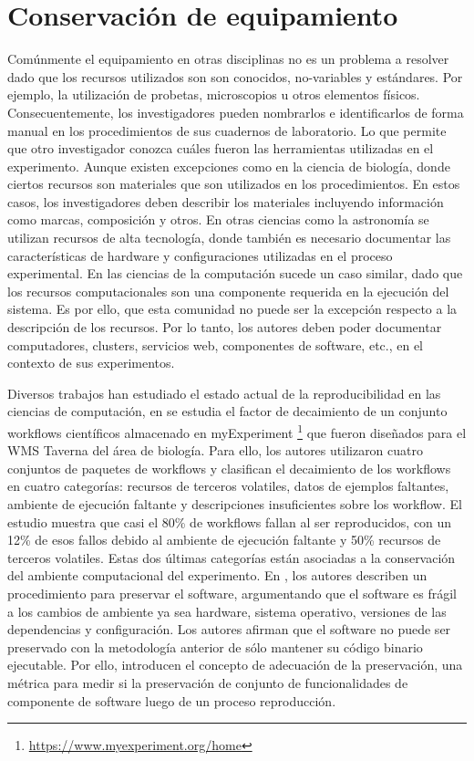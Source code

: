 \section{Conservación de equipamiento}
Comúnmente el equipamiento en otras disciplinas no es un problema a resolver dado que los recursos utilizados son son conocidos, no-variables y estándares. Por ejemplo, la utilización de probetas, microscopios u otros elementos físicos. 
Consecuentemente, los investigadores pueden nombrarlos e identificarlos de forma manual en los procedimientos de sus cuadernos de laboratorio. Lo que permite que otro investigador conozca cuáles fueron las herramientas utilizadas en el experimento.
Aunque existen excepciones como en la ciencia de biología, donde ciertos recursos son materiales que son utilizados en los procedimientos. En estos casos, los investigadores deben describir los materiales incluyendo información como marcas, composición y otros. 
En otras ciencias como la astronomía se utilizan recursos  de alta tecnología, donde también es necesario documentar las características de hardware y configuraciones utilizadas en el proceso experimental. 
En las ciencias de la computación sucede un caso similar, dado que los recursos computacionales son una componente requerida en la ejecución del sistema. 
Es por ello, que esta comunidad no puede ser la excepción respecto a la descripción de los recursos. Por lo tanto, los autores deben poder documentar computadores, clusters, servicios web, componentes de software, etc., en el contexto de sus experimentos.

Diversos trabajos han estudiado el estado actual de la reproducibilidad en las ciencias de computación, en \cite{DBLP:conf/eScience/ZhaoGBKGGHRRG12} se estudia el factor de decaimiento de un conjunto workflows científicos almacenado en myExperiment \footnote{\url{https://www.myexperiment.org/home}} que fueron diseñados para el WMS Taverna \cite{DBLP:journals/bioinformatics/OinnAFMSGCGPWL04} del área de biología. Para ello, los autores utilizaron cuatro conjuntos de paquetes de workflows y clasifican el decaimiento de los workflows en cuatro categorías: recursos de terceros volatiles, datos de ejemplos faltantes, ambiente de ejecución faltante y descripciones insuficientes sobre los workflow. El estudio muestra que casi el 80\% de workflows fallan al ser reproducidos, con un 12\% de esos fallos debido al ambiente de ejecución faltante y 50\% recursos de terceros volatiles. Estas dos últimas categorías están asociadas a la conservación del ambiente computacional del experimento.
En \cite{DBLP:conf/ipres/MatthewsCWJBS09}, los autores describen un procedimiento para preservar el software, argumentando que el software es frágil a los cambios de ambiente ya sea hardware, sistema operativo, versiones de las dependencias y configuración. Los autores afirman que el software no puede ser preservado con la metodología anterior de sólo mantener su código binario ejecutable. Por ello, introducen el concepto de adecuación de la preservación, una métrica para medir si la preservación de conjunto de funcionalidades de componente de software luego de un proceso reproducción.

